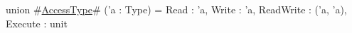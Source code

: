 union #\hyperref[sailRISCVzAccessType]{AccessType}# ('a : Type) = {
  Read      : 'a,
  Write     : 'a,
  ReadWrite : ('a, 'a),
  Execute   : unit
}
